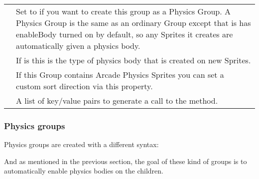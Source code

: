 \documentclass[letterpaper,10pt,english]{sphinxmanual}
\begin{document}
\begin{savenotes}\sphinxattablestart
\centering
\begin{tabulary}{\linewidth}[t]{|T|T|}
\hline
{}\relax &\relax \\
\hline
{}
&
Set to  if you want to create this group as a Physics Group. A Physics Group is the same as an ordinary Group except that is has enableBody turned on by default, so any Sprites it creates are automatically given a physics body.
\\
\hline
{}
&
If  is  this is the type of physics body that is created on new Sprites.
\\
\hline
{}
&
If this Group contains Arcade Physics Sprites you can set a custom sort direction via this property.
\\
\hline
{}
&
A list of key/value pairs to generate a call to the  method.
\\
\hline
\end{tabulary}
\par
\sphinxattableend\end{savenotes}


\subsubsection{Physics groups}
\label{\detokenize{canvas:physics-groups}}
Physics groups are created with a different syntax:

\begin{sphinxVerbatim}[commandchars=\\\{\}]
   
  
\end{sphinxVerbatim}

And as mentioned in the previous section, the goal of these kind of groups is to automatically enable physics bodies on the children.
\end{document}
